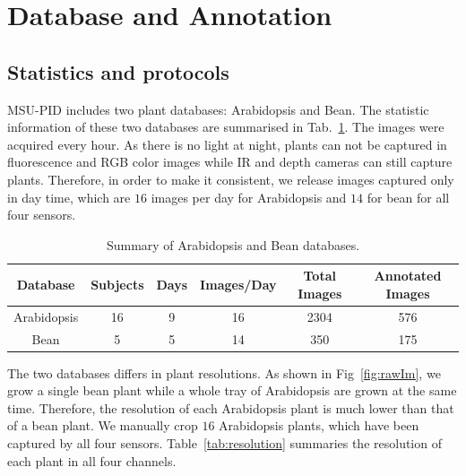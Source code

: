 \section{Database and Annotation}
\subsection{Statistics and protocols}
MSU-PID includes two plant databases: Arabidopsis and Bean.
The statistic information of these two databases are summarised in Tab.~\ref{tab:stat}.
The images were acquired every hour.
As there is no light at night, plants can not be captured in fluorescence and RGB color images while IR and depth cameras can still capture plants.
Therefore, in order to make it consistent, we release images captured only in day time, which are $16$ images per day for Arabidopsis and $14$ for bean for all four sensors.

\begin{table}
\begin{center}
\caption{Summary of Arabidopsis and Bean databases.}
\label{tab:stat}
\begin{tabular}{c|c|c|c|c|c}
      \hline
      Database     & Subjects & Days & Images/Day & Total Images & Annotated Images \\
      \hline
      Arabidopsis &  16      &  9   &     16     &     2304     &       576    \\
      Bean        &   5      &  5   &     14     &     350      &       175 \\
      \hline
\end{tabular}
\end{center}
\end{table}

The two databases differs in plant resolutions.
As shown in Fig~\ref{fig:rawIm},  we grow a single bean plant while a whole tray of Arabidopsis are grown at the same time.
Therefore, the resolution of each Arabidopsis plant is much lower than that of a bean plant.
We manually crop $16$ Arabidopsis plants, which have been captured by all four sensors.
Table~\ref{tab:resolution} summaries the resolution of each plant in all four channels.

